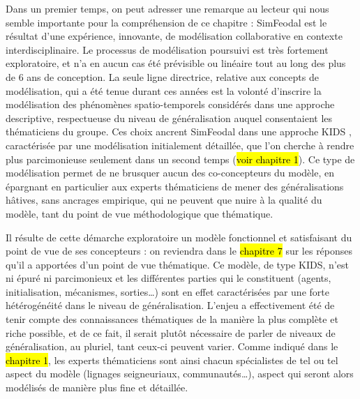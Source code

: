 Dans un premier temps, on peut adresser une remarque au lecteur qui nous semble importante pour la compréhension de ce chapitre : SimFeodal est le résultat d'une expérience, innovante, de modélisation collaborative en contexte interdisciplinaire.
Le processus de modélisation poursuivi est très fortement exploratoire, et n'a en aucun cas été prévisible ou linéaire tout au long des plus de 6 ans de conception.
La seule ligne directrice, relative aux concepts de modélisation, qui a été tenue durant ces années est la volonté d'inscrire la modélisation des phénomènes spatio-temporels considérés dans une approche descriptive, respectueuse du niveau de généralisation auquel consentaient les thématiciens du groupe.
Ces choix ancrent SimFeodal dans une approche \og KIDS\fg{} \autocite{edmonds_kiss_2005}, caractérisée par une modélisation initialement détaillée, que l'on cherche à rendre plus parcimonieuse seulement dans un second temps (\hl{voir chapitre 1}).
Ce type de modélisation permet de ne brusquer aucun des co-concepteurs du modèle, en épargnant en particulier aux experts thématiciens de mener des généralisations hâtives, sans ancrages empirique, qui ne peuvent que nuire à la qualité du modèle, tant du point de vue méthodologique que thématique.

Il résulte de cette démarche exploratoire un modèle fonctionnel et satisfaisant du point de vue de ses concepteurs : on reviendra dans le \hl{chapitre 7} sur les réponses qu'il a apportées d'un point de vue thématique.
Ce modèle, de type \og KIDS\fg{}, n'est ni épuré ni parcimonieux et les différentes parties qui le constituent (agents, initialisation, mécanismes, sorties\ldots) sont en effet caractérisées par une forte hétérogénéité dans le niveau de généralisation.
L'enjeu a effectivement été de tenir compte des connaissances thématiques de la manière la plus complète et riche possible, et de ce fait, il serait plutôt nécessaire de parler de niveaux de généralisation, au pluriel, tant ceux-ci peuvent varier.
Comme indiqué dans le \hl{chapitre 1}, les experts thématiciens sont ainsi chacun spécialistes de tel ou tel aspect du modèle (lignages seigneuriaux, communautés\ldots), aspect qui seront alors modélisés de manière plus fine et détaillée.

